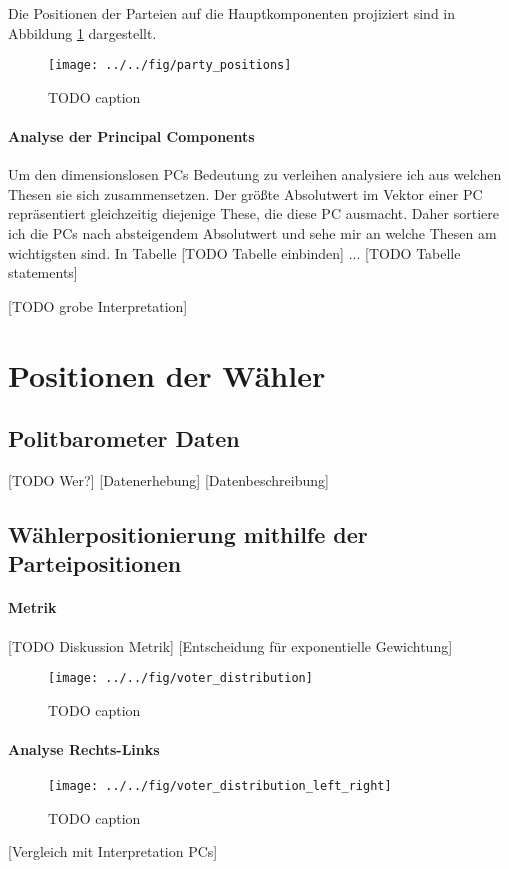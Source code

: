Die Positionen der Parteien auf die Hauptkomponenten projiziert sind in Abbildung \ref{fig:party-positions-pca} dargestellt.

\begin{figure}[htb]
	\centering
	\texttt{[image: ../../fig/party\_positions]}
	\caption{TODO caption}
	\label{fig:party-positions-pca}
\end{figure}

\paragraph{Analyse der Principal Components}
Um den dimensionslosen PCs Bedeutung zu verleihen analysiere ich aus welchen Thesen sie sich zusammensetzen. Der größte Absolutwert im Vektor einer PC repräsentiert gleichzeitig diejenige These, die diese PC ausmacht. Daher sortiere ich die PCs nach absteigendem Absolutwert und sehe mir an welche Thesen am wichtigsten sind. In Tabelle [TODO Tabelle einbinden] ...
[TODO Tabelle statements]

[TODO grobe Interpretation]

\section{Positionen der Wähler}\label{Sec-Wählerpositionen}

\subsection{Politbarometer Daten}
[TODO Wer?]
[Datenerhebung]
[Datenbeschreibung]

\subsection{Wählerpositionierung mithilfe der Parteipositionen}
\paragraph{Metrik}
[TODO Diskussion Metrik]
[Entscheidung für exponentielle Gewichtung]
\begin{figure}[htb]
	\centering
	\texttt{[image: ../../fig/voter\_distribution]}
	\caption{TODO caption}
	\label{fig:voter-positions-pca}
\end{figure}

\paragraph{Analyse Rechts-Links}
\begin{figure}[htb]
	\centering
	\texttt{[image: ../../fig/voter\_distribution\_left\_right]}
	\caption{TODO caption}
	\label{fig:voter-positions-pca-left-right}
\end{figure}
[Vergleich mit Interpretation PCs]

